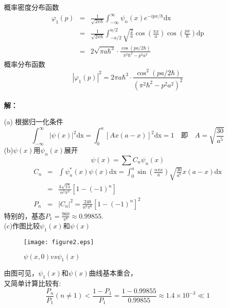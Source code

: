 \documentclass[a4paper]{article}
\begin{document}
\begin{CJK*}{UTF8}{song}
{    概率密度分布函数
    \begin{eqnarray}
        \varphi_{1}(p) & = & \frac{1}{\sqrt{2\pi\hbar}} \int_{-\infty}^{\infty}
        \psi_{n}(x) e ^{ - i p x / \hbar}\mathrm{d x}\nonumber \\[7pt]
            & = & \frac{1}{\sqrt{2\pi\hbar}} \int^{a/2}_{-a/2}
            \sqrt{\frac{2}{a}}\cos (\frac{\pi x}{a})\cos (\frac{p x }{\hbar})\mathrm{d p}\nonumber\\[7pt]
                & = &  2\sqrt{\pi a \hbar^{3}} \cdot \frac{\cos (p a /2\hbar)}{\pi^{2}\hbar^{2} - p^{2}a^{2}}\nonumber
    \end{eqnarray}
    概率分布函数
    $$|\varphi_{1}(p)|^{2} =
        2\pi a \hbar^{3} \cdot \frac{\cos^{2}(p a /2\hbar)}{(\pi^{2}\hbar^{2} - p^{2}a^{2})^{2}}
        $$
    }\\[20pt]
     \textbf{解：}\\[12pt]
    {
    \noindent (a) \quad 根据归一化条件
    $$\int_{-\infty}^{\infty} |\psi (x)|^{2} \mathrm{d x}
        = \int_{0}^{a} [A x ( a - x)]^{2} \mathrm{d x}
        = 1 \quad \mbox{即} \quad A = \sqrt{\frac{30}{a^5}}
        $$
    \noindent (b)\quad$\psi (x)$用$\psi_{n}(x)$展开
    $$\psi (x) = \sum C_{n} \psi_{n}(x)$$
    \begin{eqnarray}
        C_{n} & = & \int \psi_{n}^{*} (x) \psi (x) \mathrm{d x}
        =  \int_{0}^{a} \sin (\frac{n \pi x}{a}) \sqrt{\frac{30}{a^{5}}} x (a - x) \mathrm{d x}\nonumber\\
            & = & \frac{4\sqrt{15}}{n^{2} \pi^{3}}[1 - (-1)^{n}]\nonumber\\
        P_{n} & = & |C_{n}|^{2} = \frac{240}{n^{6} \pi^{6}}[1 - (-1)^{n}]^{2}\nonumber
    \end{eqnarray}
    特别的，基态$\displaystyle P_{1}=\frac{960}{\pi^{6}} \approx 0.99855.$\\[8pt]
    \noindent (c)\quad 作图比较$\psi_{1}(x)$和$\psi (x)$\\[8pt]
    \begin{figure}[ht]
      \centering
      \texttt{[image: figure2.eps]}\\
      \caption{$\psi(x,0) vs \psi_{1}(x)$}
    \end{figure}
    由图可见，$\psi_{1}(x)$和$\psi (x)$曲线基本重合，\\
    又简单计算比较有: 
    $$\displaystyle \frac{P_{n}}{P_{1}}(n \neq 1)<\frac{1- P_{1}}{P_{1}} = \frac{1 - 0.99855}{0.99855} \approx 1.4 \times 10^{-3} \ll 1
$$}
\end{CJK*}
\end{document}
